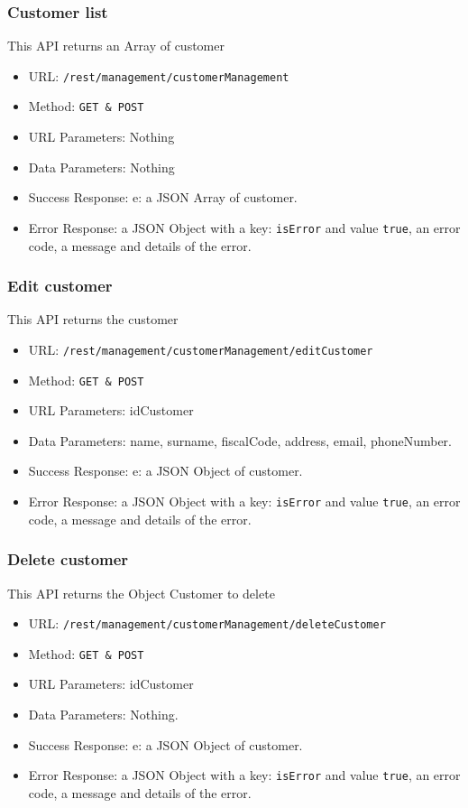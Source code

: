 \subsubsection*{Customer list}
This API returns an Array of customer

\begin{itemize}
    \item URL: \texttt{/rest/management/customerManagement}
    \item Method: \texttt{{GET \& POST}}
    \item URL Parameters: Nothing
    \item Data Parameters: Nothing
    \item Success Response: e: a JSON Array of customer.
    \item Error Response: a JSON Object with a key: \texttt{isError}  and value \texttt{true}, an error code, a message and details of the error.
\end{itemize}

\subsubsection*{Edit customer}
This API returns the customer
\begin{itemize}
    \item URL: \texttt{/rest/management/customerManagement/editCustomer}
    \item Method: \texttt{{GET \& POST}}
    \item URL Parameters: idCustomer
    \item Data Parameters: name, surname, fiscalCode, address, email, phoneNumber.
    \item Success Response: e: a JSON Object of customer.
    \item Error Response: a JSON Object with a key: \texttt{isError}  and value \texttt{true}, an error code, a message and details of the error.
\end{itemize}

\subsubsection*{Delete customer}
This API returns the Object Customer to delete
\begin{itemize}
    \item URL: \texttt{/rest/management/customerManagement/deleteCustomer}
    \item Method: \texttt{{GET \& POST}}
    \item URL Parameters: idCustomer
    \item Data Parameters: Nothing.
    \item Success Response: e: a JSON Object of customer.
    \item Error Response: a JSON Object with a key: \texttt{isError}  and value \texttt{true}, an error code, a message and details of the error.
\end{itemize}

